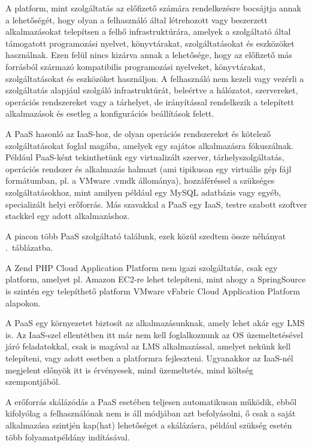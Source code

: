 A platform, mint szolgáltatás az előfizető számára rendelkezésre bocsájtja annak a lehetőségét, hogy olyan a felhasználó által létrehozott vagy beszerzett alkalmazásokat telepítsen a felhő infrastruktúrára, amelyek a szolgáltató által támogatott programozási nyelvet, könyvtárakat, szolgáltatásokat és eszközöket használnak. Ezen felül nincs kizárva  annak a lehetősége, hogy az előfizető más forrásból származó kompatibilis programozási nyelveket, könyvtárakat, szolgáltatásokat és eszközöket használjon. A felhasználó nem kezeli vagy vezérli a szolgáltatás alapjául szolgáló infrastruktúrát, beleértve a hálózatot, szervereket, operációs rendszereket vagy a tárhelyet, de irányítással rendelkezik a telepített alkalmazások és esetleg a konfigurációs beállítások felett\cite{nistsp800-145}.

A PaaS hasonló az IaaS-hoz, de olyan operációs rendszereket és kötelező szolgáltatásokat foglal magába, amelyek egy sajátos alkalmazásra fókuszálnak. Például PaaS-ként tekinthetünk egy virtualizált szerver, tárhelyszolgáltatás, operációs rendszer és alkalmazás halmazt (ami tipikusan egy virtuális gép fájl formátumban, pl. a VMware .vmdk állománya), hozzáféréssel a szükséges szolgáltatásokhoz, mint amilyen például egy MySQL adatbázis vagy egyéb, specializált helyi erőforrás. Más szavakkal a PaaS egy IaaS, testre szabott szoftver stackkel egy adott alkalmazáshoz\cite{ccwlinux}.

A piacon több PaaS szolgáltató találunk, ezek közül szedtem össze néhányat .~táblázatba.

 


A Zend PHP Cloud Application Platform nem igazi szolgáltatás, csak egy platform, amelyet pl. Amazon EC2-re lehet telepíteni, mint ahogy a SpringSource is szintén egy telepíthető platform VMware vFabric Cloud Application Platform alapokon.

A PaaS egy környezetet biztosít az alkalmazásunknak, amely lehet akár egy LMS is. Az IaaS-szel ellentétben itt már nem kell foglalkoznunk az OS üzemeltetésével járó feladatokkal, csak is magával az LMS alkalmazással, amelyet nekünk kell telepíteni, vagy adott esetben a platformra fejleszteni. Ugyanakkor az IaaS-nél megjelent előnyök itt is érvényesek, mind üzemeltetés, mind költség szempontjából.

A erőforrás skálázódás a PaaS esetében teljesen automatikusan működik, ebből kifolyólag a felhasználónak nem is áll módjában azt befolyásolni, ő csak a saját alkalmazása szintjén kap(hat) lehetőséget a skálázásra, például szükség esetén több folyamatpéldány indításával.

